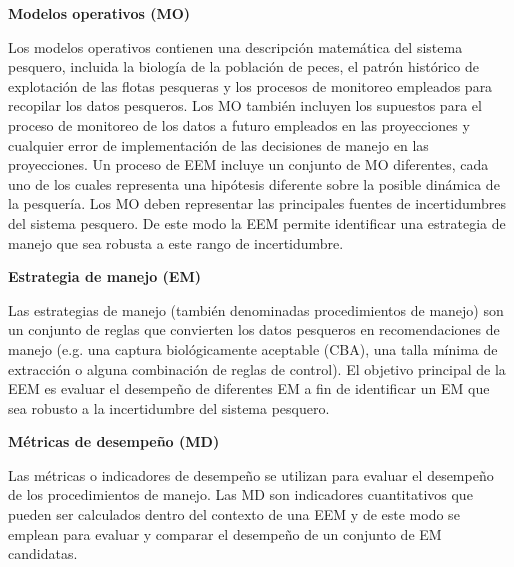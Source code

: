 
\textbf{Modelos operativos (MO)}
\newline

Los modelos operativos contienen una descripción matemática del sistema pesquero, incluida la biología de la población de peces, el patrón histórico de explotación de las flotas pesqueras y los procesos de monitoreo empleados para recopilar los datos pesqueros. Los MO también incluyen los supuestos para el proceso de monitoreo de los datos a futuro empleados en las proyecciones y cualquier error de implementación de las decisiones de manejo en las proyecciones. Un proceso de EEM incluye un conjunto de MO diferentes, cada uno de los cuales representa una hipótesis diferente sobre la posible dinámica de la pesquería. Los MO deben representar las principales fuentes de incertidumbres del sistema pesquero. De este modo la EEM permite identificar una estrategia de manejo que sea robusta a este rango de incertidumbre.
\newline

\hspace{-20pt}\textbf{Estrategia de manejo (EM)}
\newline

Las estrategias de manejo (también denominadas procedimientos de manejo) son un conjunto de reglas que convierten los datos pesqueros en recomendaciones de manejo (e.g. una captura biológicamente aceptable (CBA), una talla mínima de extracción o alguna combinación de reglas de control). El objetivo principal de la EEM es evaluar el desempeño de diferentes EM a fin de identificar un EM que sea robusto a la incertidumbre del sistema pesquero.
\newline

\hspace{-20pt}\textbf{Métricas de desempeño (MD)}
\newline

Las métricas o indicadores de desempeño se utilizan para evaluar el desempeño de los procedimientos de manejo. Las MD son indicadores cuantitativos que pueden ser calculados dentro del contexto de una EEM y de este modo se emplean para evaluar y comparar el desempeño de un conjunto de EM candidatas.
